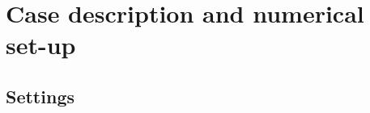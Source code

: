 \documentclass[a4paper,11pt]{article}
\begin{document}
\section{Case description and numerical set-up}
\label{setup}
%
%

\subsection{Settings}
\end{document}
